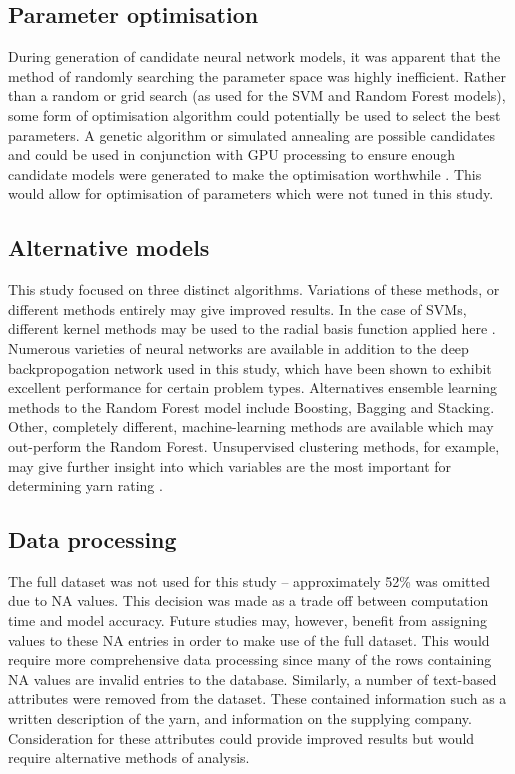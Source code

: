 \documentclass[journal]{IEEEtran}
\begin{document}
\subsection{Parameter optimisation}
During generation of candidate neural network models, it was apparent that the method of randomly searching the parameter space was highly inefficient. Rather than a random or grid search (as used for the SVM and Random Forest models), some form of optimisation algorithm could potentially be used to select the best parameters. A genetic algorithm or simulated annealing are possible candidates and could be used in conjunction with GPU processing to ensure enough candidate models were generated to make the optimisation worthwhile \cite{Elyan2016,Coroiu2016}. This would allow for optimisation of parameters which were not tuned in this study.

\subsection{Alternative models}
This study focused on three distinct algorithms. Variations of these methods, or different methods entirely may give improved results. In the case of SVMs, different kernel methods may be used to the radial basis function applied here \cite{williams}. Numerous varieties of neural networks are available in addition to the deep backpropogation network used in this study, which have been shown to exhibit excellent performance for certain problem types\cite{nntypes}. Alternatives ensemble learning methods to the Random Forest model include Boosting, Bagging and Stacking\cite{williams,witten}. Other, completely different, machine-learning methods are available which may out-perform the Random Forest. Unsupervised clustering methods, for example, may give further insight into which variables are the most important for determining yarn rating \cite{witten}.

\subsection{Data processing}
The full dataset was not used for this study – approximately 52\% was omitted due to NA values. This decision was made as a trade off between computation time and model accuracy. Future studies may, however, benefit from assigning values to these NA entries in order to make use of the full dataset. This would require more comprehensive data processing since many of the rows containing NA values are invalid entries to the database.
Similarly, a number of text-based attributes were removed from the dataset. These contained information such as a written description of the yarn, and information on the supplying company. Consideration for these attributes could provide improved results but would require alternative methods of analysis.
\end{document}
